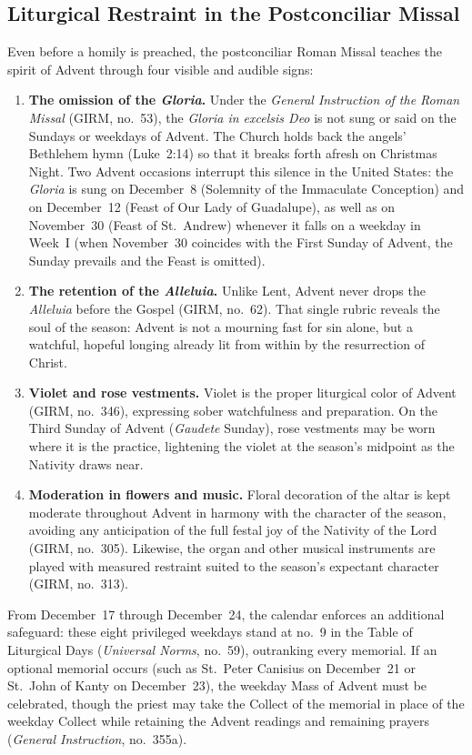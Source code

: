\subsection{Liturgical Restraint in the Postconciliar Missal}

Even before a homily is preached, the postconciliar Roman Missal teaches the spirit of Advent through four visible and audible signs:

\begin{enumerate}
  \item \textbf{The omission of the \textit{Gloria}.} Under the \textit{General Instruction of the Roman Missal} (GIRM, no.~53), the \textit{Gloria in excelsis Deo} is not sung or said on the Sundays or weekdays of Advent. The Church holds back the angels' Bethlehem hymn (Luke~2:14) so that it breaks forth afresh on Christmas Night. Two Advent occasions interrupt this silence in the United States: the \textit{Gloria} is sung on December~8 (Solemnity of the Immaculate Conception) and on December~12 (Feast of Our Lady of Guadalupe), as well as on November~30 (Feast of St.~Andrew) whenever it falls on a weekday in Week~I (when November~30 coincides with the First Sunday of Advent, the Sunday prevails and the Feast is omitted).
  \item \textbf{The retention of the \textit{Alleluia}.} Unlike Lent, Advent never drops the \textit{Alleluia} before the Gospel (GIRM, no.~62). That single rubric reveals the soul of the season: Advent is not a mourning fast for sin alone, but a watchful, hopeful longing already lit from within by the resurrection of Christ.
  \item \textbf{Violet and rose vestments.} Violet is the proper liturgical color of Advent (GIRM, no.~346), expressing sober watchfulness and preparation. On the Third Sunday of Advent (\textit{Gaudete} Sunday), rose vestments may be worn where it is the practice, lightening the violet at the season's midpoint as the Nativity draws near.
  \item \textbf{Moderation in flowers and music.} Floral decoration of the altar is kept moderate throughout Advent in harmony with the character of the season, avoiding any anticipation of the full festal joy of the Nativity of the Lord (GIRM, no.~305). Likewise, the organ and other musical instruments are played with measured restraint suited to the season's expectant character (GIRM, no.~313).
\end{enumerate}

From December~17 through December~24, the calendar enforces an additional safeguard: these eight privileged weekdays stand at no.~9 in the Table of Liturgical Days (\textit{Universal Norms}, no.~59), outranking every memorial. If an optional memorial occurs (such as St.~Peter Canisius on December~21 or St.~John of Kanty on December~23), the weekday Mass of Advent must be celebrated, though the priest may take the Collect of the memorial in place of the weekday Collect while retaining the Advent readings and remaining prayers (\textit{General Instruction}, no.~355a).

